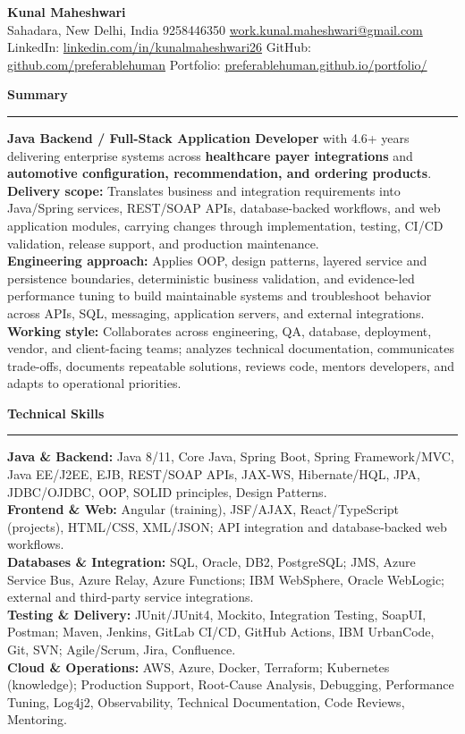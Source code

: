 \documentclass[11pt,letterpaper]{article}
\newcommand{\ressection}[1]{\Needspace{6\baselineskip}\vspace{8pt}\par\textbf{#1}\par\vspace{2pt}\hrule\vspace{5pt}}
\begin{document}
\pagestyle{empty}\raggedright\fontsize{11}{12.5}\selectfont

{\Large \textbf{Kunal Maheshwari}}\\
Sahadara, New Delhi, India \textbar{} 9258446350 \textbar{} \href{mailto:work.kunal.maheshwari@gmail.com}{work.kunal.maheshwari@gmail.com}\\
LinkedIn: \href{https://www.linkedin.com/in/kunalmaheshwari26}{linkedin.com/in/kunalmaheshwari26} \textbar{} GitHub: \href{https://github.com/preferablehuman}{github.com/preferablehuman} \textbar{} Portfolio: \href{https://preferablehuman.github.io/portfolio/}{preferablehuman.github.io/portfolio/}

\ressection{Summary}
\textbf{Java Backend / Full-Stack Application Developer} with 4.6+ years delivering enterprise systems across \textbf{healthcare payer integrations} and \textbf{automotive configuration, recommendation, and ordering products}.\\[2pt]
\textbf{Delivery scope:} Translates business and integration requirements into Java/Spring services, REST/SOAP APIs, database-backed workflows, and web application modules, carrying changes through implementation, testing, CI/CD validation, release support, and production maintenance.\\[2pt]
\textbf{Engineering approach:} Applies OOP, design patterns, layered service and persistence boundaries, deterministic business validation, and evidence-led performance tuning to build maintainable systems and troubleshoot behavior across APIs, SQL, messaging, application servers, and external integrations.\\[2pt]
\textbf{Working style:} Collaborates across engineering, QA, database, deployment, vendor, and client-facing teams; analyzes technical documentation, communicates trade-offs, documents repeatable solutions, reviews code, mentors developers, and adapts to operational priorities.

\ressection{Technical Skills}
\textbf{Java \& Backend:} Java 8/11, Core Java, Spring Boot, Spring Framework/MVC, Java EE/J2EE, EJB, REST/SOAP APIs, JAX-WS, Hibernate/HQL, JPA, JDBC/OJDBC, OOP, SOLID principles, Design Patterns.\\
\textbf{Frontend \& Web:} Angular (training), JSF/AJAX, React/TypeScript (projects), HTML/CSS, XML/JSON; API integration and database-backed web workflows.\\
\textbf{Databases \& Integration:} SQL, Oracle, DB2, PostgreSQL; JMS, Azure Service Bus, Azure Relay, Azure Functions; IBM WebSphere, Oracle WebLogic; external and third-party service integrations.\\
\textbf{Testing \& Delivery:} JUnit/JUnit4, Mockito, Integration Testing, SoapUI, Postman; Maven, Jenkins, GitLab CI/CD, GitHub Actions, IBM UrbanCode, Git, SVN; Agile/Scrum, Jira, Confluence.\\
\textbf{Cloud \& Operations:} AWS, Azure, Docker, Terraform; Kubernetes (knowledge); Production Support, Root-Cause Analysis, Debugging, Performance Tuning, Log4j2, Observability, Technical Documentation, Code Reviews, Mentoring.
\end{document}
